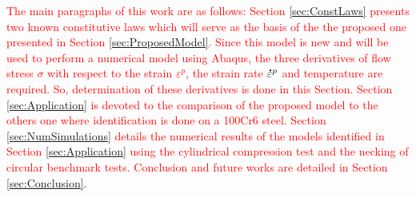 \documentclass[twoside,english,1p,final,sort&compress]{elsarticle}
\theoremstyle{plain}
\newcommand{\mdot}[1]{\accentset{\mbox{\bfseries .}}{#1}}
\begin{document}
\textcolor{red}{The main paragraphs of this work are as follows: Section \ref{sec:ConstLaws} presents two  known constitutive laws which will serve as the basis of the the proposed one presented in Section \ref{sec:ProposedModel}. Since this model is new and will be used to perform a numerical model using Abaqus, the three derivatives of flow stress $\sigma$ with respect to the strain $\varepsilon^p$, the strain rate $\mdot{\varepsilon}^p$ and temperature are required. So, determination of these derivatives is done in this Section. Section \ref{sec:Application} is devoted to the comparison of the proposed model to the others one where identification is done on a 100Cr6 steel. Section \ref{sec:NumSimulations} details the numerical results of the models identified in Section \ref{sec:Application} using the cylindrical compression test and the necking of circular benchmark tests. Conclusion and future works are detailed in Section \ref{sec:Conclusion}}.

\end{document}
